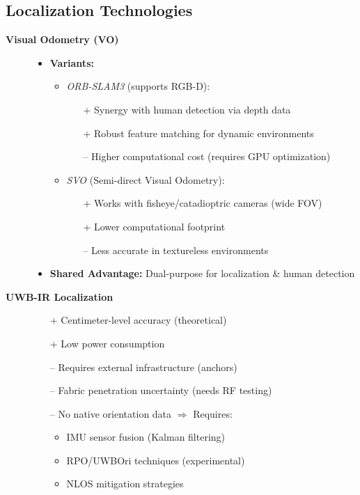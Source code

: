 \subsection*{Localization Technologies}

\begin{description}
\item[\textbf{Visual Odometry (VO)}]
\hfill
\begin{itemize}[leftmargin=*,nosep]
    \item \textbf{Variants:}
    \begin{itemize}
        \item \textit{ORB-SLAM3} (supports RGB-D): \cite{orbslam3github}
        \begin{itemize}
            \item[+] Synergy with human detection via depth data
            \item[+] Robust feature matching for dynamic environments
            \item[--] Higher computational cost (requires GPU optimization)
        \end{itemize}
        \item \textit{SVO} (Semi-direct Visual Odometry): \cite{svogithub}
        \begin{itemize}
            \item[+] Works with fisheye/catadioptric cameras (wide FOV)
            \item[+] Lower computational footprint
            \item[--] Less accurate in textureless environments
        \end{itemize}
    \end{itemize}
    \item \textbf{Shared Advantage:} Dual-purpose for localization \& human detection
\end{itemize}

\item[\textbf{UWB-IR Localization}]
\hfill
\begin{itemize}[leftmargin=*,nosep]
    \item[+] Centimeter-level accuracy (theoretical)
    \item[+] Low power consumption
    \item[--] Requires external infrastructure (anchors)
    \item[--] Fabric penetration uncertainty (needs RF testing)
    \item[--] No native orientation data $\Rightarrow$ Requires:
    \begin{itemize}
        \item IMU sensor fusion (Kalman filtering)
        \item RPO/UWBOri techniques (experimental)
        \item NLOS mitigation strategies
    \end{itemize}
\end{itemize}


\end{description}
